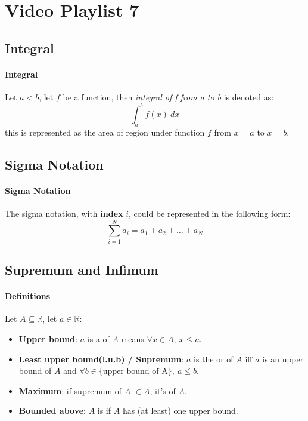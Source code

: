 \documentclass{article}
\begin{document}
	\section{Video Playlist 7}
	\subsection{Integral}
	\paragraph{Integral} Let $a < b$, let $f$ be a  function, then \emph{integral of f from a to b} is denoted as:
	\[
	\int_{a}^{b} f(x)\  dx
	\]
	this is represented as the area of region under function $f$ from $x=a$ to $x=b$.
	\subsection{Sigma Notation}
	\paragraph{Sigma Notation} The sigma notation, with \textbf{index} $i$, could be represented in the following form:
	\[
	\sum_{i=1}^{N}a_i = a_1 + a_2 + \dots + a_N
	\]
	\subsection{Supremum and Infimum}
	\paragraph{Definitions} Let $A \subseteq \mathbb{R}$, let $a \in \mathbb{R}$:
	\begin{itemize}
		\item \textbf{Upper bound}: $a$ is a  of $A$ means $\forall x \in A,\ x \leq a$.
		\item \textbf{Least upper bound(l.u.b) / Supremum}: $a$ is the  or  of $A$ iff $a$ is an upper bound of $A$ and $\forall b \in \{\text{upper bound of A}\},\  a \leq b$.
		\item \textbf{Maximum}: if supremum of $A$ $\in A$, it's  of $A$.
		\item \textbf{Bounded above}: $A$ is  if $A$ has (at least) one upper bound.
	\end{itemize}
\end{document}
